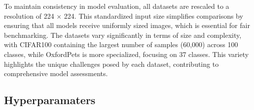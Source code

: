 To maintain consistency in model evaluation, all datasets are rescaled to a resolution of 224 × 224. This standardized input size simplifies comparisons by ensuring that all models receive uniformly sized images, which is essential for fair benchmarking. The datasets vary significantly in terms of size and complexity, with CIFAR100 containing the largest number of samples (60,000) across 100 classes, while OxfordPets is more specialized, focusing on 37 classes. This variety highlights the unique challenges posed by each dataset, contributing to comprehensive model assessments.



\begin{table}
\centering
{}
\caption{Details about the vision datasets.}
\label{tab-image}
\end{table}

\subsection{Hyperparamaters}


